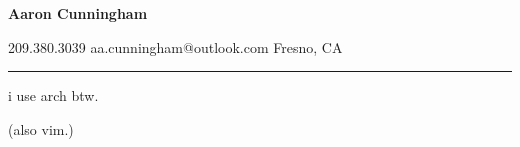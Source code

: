 \documentclass[11pt,letterpaper]{article}
\newcommand{\innerbullet}
{\hspace{0.6em}\textbullet\hspace{0.6em}}
\begin{document}
\begin{center}
    {\huge \textbf{Aaron Cunningham}}

    209.380.3039\innerbullet
    aa.cunningham@outlook.com\innerbullet
    Fresno, CA
\end{center}


\hrule

\begin{center}
    \vspace{20em}
    \Large i use arch btw.\par
    \large (also vim.)
\end{center}
\end{document}

